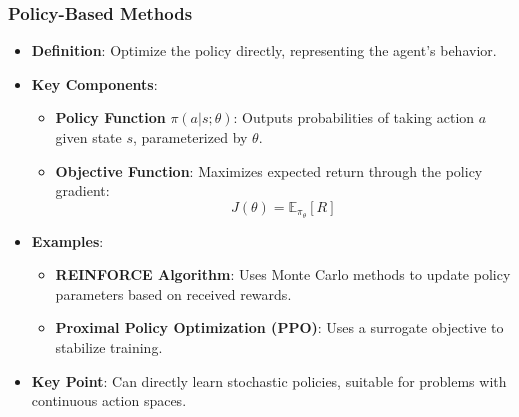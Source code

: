\documentclass[aspectratio=169]{beamer}
\begin{document}
\begin{frame}[fragile]
    \frametitle{Policy-Based Methods}
    \begin{itemize}
        \item \textbf{Definition}: Optimize the policy directly, representing the agent’s behavior.
        \item \textbf{Key Components}:
            \begin{itemize}
                \item \textbf{Policy Function} $\pi(a|s; \theta)$: Outputs probabilities of taking action $a$ given state $s$, parameterized by $\theta$.
                \item \textbf{Objective Function}: Maximizes expected return through the policy gradient:
                \[
                J(\theta) = \mathbb{E}_{\pi_{\theta}} [R]
                \]
            \end{itemize}
        \item \textbf{Examples}:
            \begin{itemize}
                \item \textbf{REINFORCE Algorithm}: Uses Monte Carlo methods to update policy parameters based on received rewards.
                \item \textbf{Proximal Policy Optimization (PPO)}: Uses a surrogate objective to stabilize training.
            \end{itemize}
        \item \textbf{Key Point}: Can directly learn stochastic policies, suitable for problems with continuous action spaces.
    \end{itemize}
\end{frame}
\end{document}
